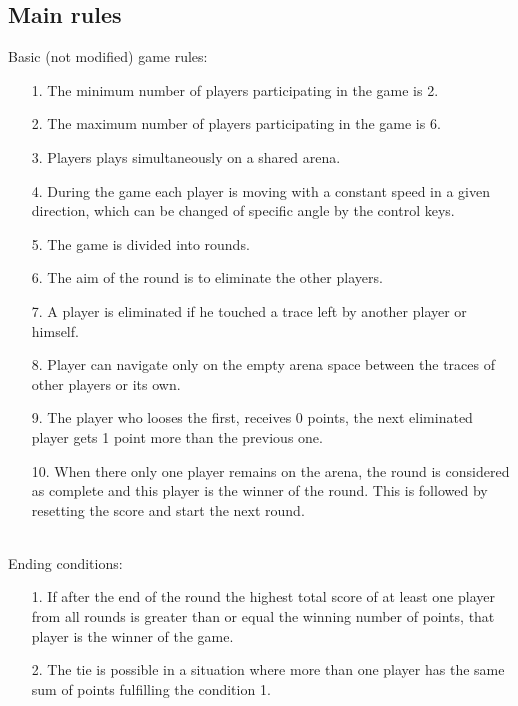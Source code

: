 \subsection{Main rules}
\noindent Basic (not modified) game rules:
\begin{itemize}
	\item[1.] The minimum number of players participating in the game is 2.
	\item[2.] The maximum number of players participating in the game is 6.
	\item[3.] Players plays simultaneously on a shared arena.
	\item[4.] During the game each player is moving with a constant speed in a given direction, which can be changed of specific angle by the control keys.
	\item[5.] The game is divided into rounds.
	\item[6.] The aim of the round is to eliminate the other players.
	\item[7.] A player is eliminated if he touched a trace left by another player or himself.
	\item[8.] Player can navigate only on the empty arena space between the traces of other players or its own.
	\item[9.] The player who looses the first, receives 0 points, the next eliminated player gets 1 point more than the previous one.
	\item[10.] When there only one player remains on the arena, the round is considered as complete and this player is the winner of the round. This is followed by resetting the score and start the next round.
\end{itemize}
\noindent
\\
\noindent Ending conditions:
\begin{itemize}
	\item[1.] If after the end of the round the highest total score of at least one player from all rounds is greater than or equal the winning number of points, that player is the winner of the game.
	\item[2.] The tie is possible in a situation where more than one player has the same sum of points fulfilling the condition 1.
\end{itemize}

